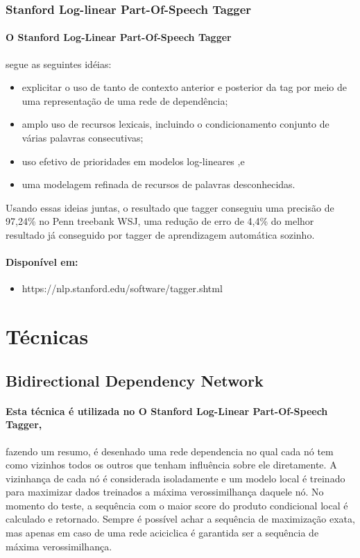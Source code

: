 \documentclass[a4paper, 10pt]{article}
\begin{document}
            \subsubsection{Stanford Log-linear Part-Of-Speech Tagger}
            	\paragraph{O Stanford Log-Linear Part-Of-Speech Tagger}
            	segue as seguintes idéias:
                \begin{itemize}
                	\item explicitar o uso de tanto de contexto anterior e posterior da tag por meio de uma representação de uma rede de dependência;
                    \item amplo uso de recursos lexicais, incluindo o condicionamento conjunto de várias palavras consecutivas;
                    \item uso efetivo de prioridades em modelos log-lineares ,e
                    \item uma modelagem refinada de recursos de palavras desconhecidas.
                \end{itemize}
            	Usando essas ideias juntas, o resultado que tagger conseguiu uma precisão de 97,24\% no Penn treebank WSJ, uma redução de erro de 4,4\% do melhor resultado já conseguido por tagger de aprendizagem automática sozinho.
            	
        	    \paragraph{Disponível em:}
                \begin{itemize}
                    \item https://nlp.stanford.edu/software/tagger.shtml
                \end{itemize}
	\section{Técnicas}
    	\subsection{Bidirectional Dependency Network}
        	\paragraph{Esta técnica é utilizada no O Stanford Log-Linear Part-Of-Speech Tagger,}
        	fazendo um resumo, é desenhado uma rede dependencia no qual cada nó tem como vizinhos todos os outros que tenham influência sobre ele diretamente. A vizinhança de cada nó é considerada isoladamente e um modelo local é treinado para maximizar dados treinados a máxima verossimilhança daquele nó. No momento do teste, a sequência com o maior score do produto condicional local é calculado e retornado. Sempre é possível achar a sequência de maximização exata, mas apenas em caso de uma rede aciciclica é garantida ser a sequência de máxima verossimilhança.
\end{document}

